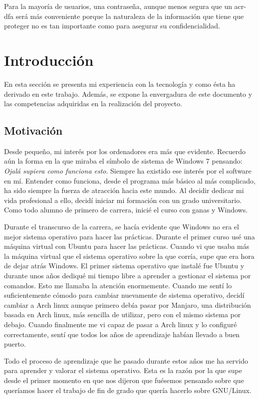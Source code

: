 \documentclass[twoside, titlepage, 12pt, a4paper]{article}
\let\oldsection\section
\def\section{\cleardoublepage\oldsection}
\begin{document}
Para la mayoría de usuarios, una contraseña, aunque menos segura que un \gls{acr-dfa} será más conveniente porque la naturaleza de la información que tiene que proteger no es tan importante como para asegurar su confidencialidad.
\clearpage
\clearpage
\section{Introducción}
En esta sección se presenta mi experiencia con la tecnología y como ésta ha derivado en este trabajo. Además, se expone la envergadura de este documento y las competencias adquiridas en la realización del proyecto.
\subsection{Motivación}
Desde pequeño, mi interés por los ordenadores era más que evidente. Recuerdo aún la forma en la que miraba el símbolo de sistema de Windows 7 pensando: \textit{Ojalá supiera como funciona esto}. Siempre ha existido ese interés por el software en mí. Entender como funciona, desde el programa más básico al más complicado, ha sido siempre la fuerza de atracción hacia este mundo. Al decidir dedicar mi vida profesional a ello, decidí iniciar mi formación con un grado universitario.
Como todo alumno de primero de carrera, inicié el curso con ganas y Windows.\par
Durante el transcurso de la carrera, se hacía evidente que Windows no era el mejor sistema operativo para hacer las prácticas. Durante el primer curso usé una máquina virtual con \gls{Ubuntu} para hacer las prácticas. Cuando vi que usaba más la máquina virtual que el sistema operativo sobre la que corría, supe que era hora de dejar atrás Windows. El primer sistema operativo que instalé fue \gls{Ubuntu} y durante unos años dediqué mi tiempo libre a aprender a gestionar el sistema por comandos. Esto me llamaba la atención enormemente. Cuando me sentí lo suficientemente cómodo para cambiar nuevamente de sistema operativo, decidí cambiar a \gls{Arch linux} aunque primero debía pasar por \gls{Manjaro}, una distribución basada en \gls{Arch linux}, más sencilla de utilizar, pero con el mismo sistema por debajo. Cuando finalmente me vi capaz de pasar a \gls{Arch linux} y lo configuré correctamente, sentí que todos los años de aprendizaje habían llevado a buen puerto. \par
Todo el proceso de aprendizaje que he pasado durante estos años me ha servido para aprender y valorar el sistema operativo. Esta es la razón por la que supe desde el primer momento en que nos dijeron que fuésemos pensando sobre que queríamos hacer el trabajo de fin de grado que quería hacerlo sobre \gls{GNU/Linux}.\par
\end{document}
